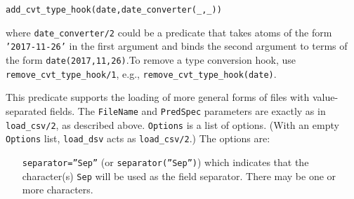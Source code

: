 \begin{description}
\begin{itemize}
  \texttt{add\_cvt\_type\_hook(date,date\_converter(\_,\_))}

  where \texttt{date\_converter/2} could be a predicate that takes
  atoms of the form \texttt{'2017-11-26'} in the first argument and
  binds the second argument to terms of the form
  \texttt{date(2017,11,26)}.To remove a type conversion hook, use
  \texttt{remove\_cvt\_type\_hook/1}, e.g.,
  \texttt{remove\_cvt\_type\_hook(date)}.
\end{itemize}


This predicate supports the loading of more general forms of files
with value-separated fields.  The {\tt FileName} and {\tt PredSpec}
parameters are exactly as in {\tt load\_csv/2}, as described above.
{\tt Options} is a list of options.  (With an empty {\tt Options}
list, {\tt load\_dsv} acts as {\tt load\_csv/2}.)  The options are:
\begin{itemize}
\item[{\tt separator=''Sep''}] (or {\tt separator(''Sep'')}) which
  indicates that the character(s) {\tt Sep} will be used as the field
  separator.  There may be one or more characters.


\end{itemize}
\end{description}

